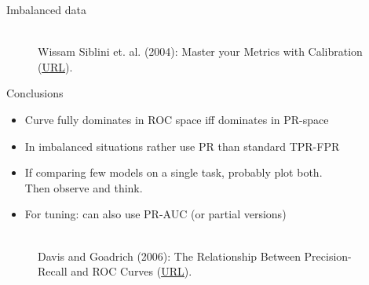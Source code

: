 \documentclass[11pt,compress,t,notes=noshow, xcolor=table]{beamer}
\begin{document}
\begin{vbframe}{Imbalanced data}
\begin{figure}
  \centering
  \tiny
  \\ Wissam Siblini et. al. (2004): Master your Metrics with Calibration
  (\href{https://arxiv.org/pdf/1909.02827.pdf}{\underline{URL}}).
\end{figure}

%

\end{vbframe}

\begin{vbframe}{Conclusions}

\begin{itemize}
 \item Curve fully dominates in ROC space iff dominates in PR-space
 \item In imbalanced situations rather use PR than standard TPR-FPR
 \item If comparing few models on a single task, probably plot both.\\
 Then observe and think.
\item For tuning: can also use PR-AUC (or partial versions)
\end{itemize}

\vfill

\begin{figure}
  \centering
  \tiny
  \\Davis and Goadrich (2006): The Relationship Between Precision-Recall and
  ROC Curves (\href{https://www.biostat.wisc.edu/~page/rocpr.pdf}
  {\underline{URL}}).
\end{figure}
\end{vbframe}

\endlecture
\end{document}
